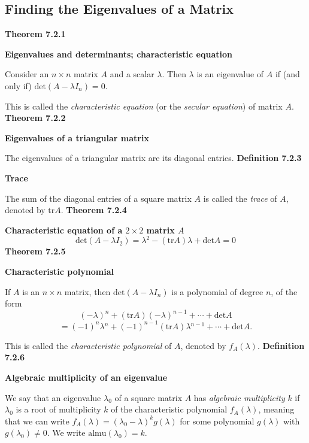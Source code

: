 \subsection{Finding the Eigenvalues of a Matrix}
\textbf{Theorem 7.2.1}\\
\par\noindent\textbf{Eigenvalues and determinants; characteristic equation}
\par\noindent Consider an $n\times{}n$ matrix $A$ and a scalar $\lambda{}$. Then $\lambda{}$ is an eigenvalue of $A$ if (and only if) $\textrm{det}(A-\lambda{}I_{n})=0$.
\par\noindent This is called the \textit{characteristic equation} (or the \textit{secular equation}) of matrix $A$.
\textbf{Theorem 7.2.2}\\
\par\noindent\textbf{Eigenvalues of a triangular matrix}
\par\noindent The eigenvalues of a triangular matrix are its diagonal entries.
\textbf{Definition 7.2.3}\\
\par\noindent\textbf{Trace}
\par\noindent The sum of the diagonal entries of a square matrix $A$ is called the \textit{trace} of $A$, denoted by $\textrm{tr}A$.
\textbf{Theorem 7.2.4}\\
\par\noindent\textbf{Characteristic equation of a $2\times{}2$ matrix $A$}
\[\textrm{det}(A-\lambda{}I_{2})=\lambda{}^{2}-(\textrm{tr}A)\lambda{}+\textrm{det}A=0\]
\textbf{Theorem 7.2.5}\\
\par\noindent\textbf{Characteristic polynomial}
\par\noindent If $A$ is an $n\times{}n$ matrix, then $\textrm{det}(A-\lambda{}I_{n})$ is a polynomial of degree $n$, of the form
\[(-\lambda{})^{n}+(\textrm{tr}A)(-\lambda{})^{n-1}+\cdots{}+\textrm{det}A\]
\[=(-1)^{n}\lambda{}^{n}+(-1)^{n-1}(\textrm{tr}A)\lambda{}^{n-1}+\cdots{}+\textrm{det}A.\]
\par\noindent This is called the \textit{characteristic polynomial} of $A$, denoted by $f_{A}(\lambda{})$.
\textbf{Definition 7.2.6}\\
\par\noindent\textbf{Algebraic multiplicity of an eigenvalue}
\par\noindent We say that an eigenvalue $\lambda{}_{0}$ of a square matrix $A$ has \textit{algebraic multiplicity} $k$ if $\lambda{}_{0}$ is a root of multiplicity $k$ of the characteristic polynomial $f_{A}(\lambda{})$, meaning that we can write $f_{A}(\lambda{})=(\lambda{}_{0}-\lambda{})^{k}g(\lambda{})$ for some polynomial $g(\lambda{})$ with $g(\lambda{}_{0})\ne{}0$. We write $\textrm{almu}(\lambda{}_{0})=k$.
